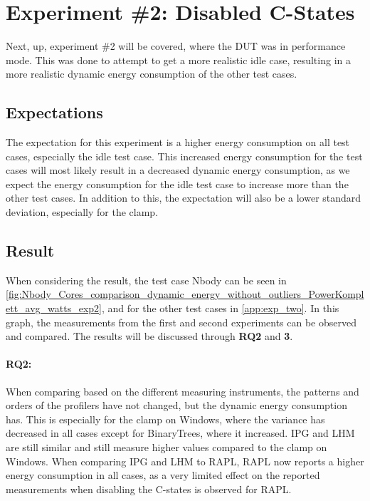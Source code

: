 \section{Experiment \#2: Disabled C-States}\label{sec:disable_c_states_exp}

Next, up, experiment \#2 will be covered, where the DUT was in performance mode. This was done to attempt to get a more realistic idle case, resulting in a more realistic dynamic energy consumption of the other test cases.

\subsection{Expectations} 

The expectation for this experiment is a higher energy consumption on all test cases, especially the idle test case. This increased energy consumption for the test cases will most likely result in a decreased dynamic energy consumption, as we expect the energy consumption for the idle test case to increase more than the other test cases. In addition to this, the expectation will also be a lower standard deviation, especially for the clamp.

\subsection{Result} 
When considering the result, the test case Nbody can be seen in \cref{fig:Nbody_Cores_comparison_dynamic_energy_without_outliers_PowerKomplett_avg_watts_exp2}, and for the other test cases in \cref{app:exp_two}. In this graph, the measurements from the first and second experiments can be observed and compared. The results will be discussed through \textbf{RQ2} and \textbf{3}.

\paragraph*{RQ2:} When comparing based on the different measuring instruments, the patterns and orders of the profilers have not changed, but the dynamic energy consumption has. This is especially for the clamp on Windows, where the variance has decreased in all cases except for BinaryTrees, where it increased. IPG and LHM are still similar and still measure higher values compared to the clamp on Windows. When comparing IPG and LHM to RAPL, RAPL now reports a higher energy consumption in all cases, as a very limited effect on the reported measurements when disabling the C-states is observed for RAPL.

